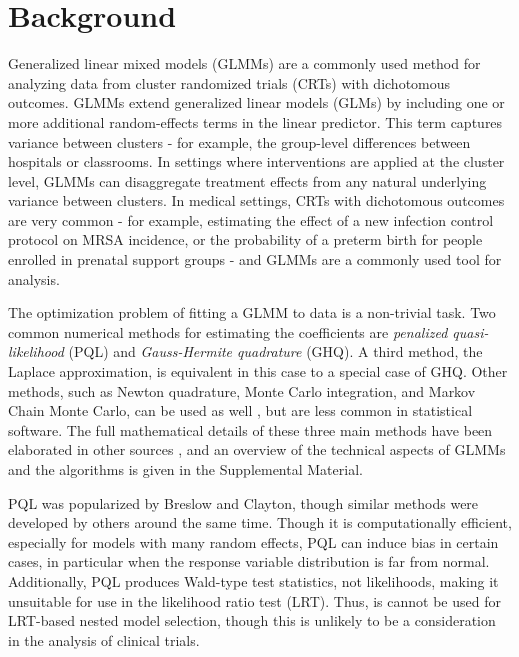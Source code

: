 \documentclass[Afour,times,sagev,doublespace]{sagej}
\begin{document}
\section{Background}
Generalized linear mixed models (GLMMs) are a commonly used method for analyzing data from cluster randomized trials (CRTs) with dichotomous outcomes. GLMMs extend generalized linear models (GLMs) by including one or more additional random-effects terms in the linear predictor. This term captures variance between clusters - for example, the group-level differences between hospitals or classrooms. In settings where interventions are applied at the cluster level, GLMMs can disaggregate treatment effects from any natural underlying variance between clusters. In medical settings, CRTs with dichotomous outcomes are very common - for example, estimating the effect of a new infection control protocol on MRSA incidence, or the probability of a preterm birth for people enrolled in prenatal support groups - and GLMMs are a commonly used tool for analysis. 

The optimization problem of fitting a GLMM to data is a non-trivial task. Two common numerical methods for estimating the coefficients are \textit{penalized quasi-likelihood} (PQL) \cite{wolfinger_generalized_1993} and \textit{Gauss-Hermite quadrature} (GHQ). A third method, the Laplace approximation, is equivalent in this case to a special case of GHQ\cite{liu_note_1994}. Other methods, such as Newton quadrature, Monte Carlo integration, and Markov Chain Monte Carlo, can be used as well \cite{zhang_fitting_2011}, but are less common in statistical software. The full mathematical details of these three main methods have been elaborated in other sources \cite{wolfinger_generalized_1993}\cite{pinheiro_efficient_2006}, and an overview of the technical aspects of GLMMs and the algorithms is given in the Supplemental Material.

PQL was popularized by Breslow and Clayton\cite{breslow_approximate_1993}, though similar methods were developed by others\cite{zeger_models_1988}\cite{engel_simple_1994} around the same time. Though it is computationally efficient, especially for models with many random effects, PQL can induce bias in certain cases, in particular when the response variable distribution is far from normal\cite{agresti_categorical_2013}\cite{rodriguez_assessment_1995}\cite{breslow_bias_1995}\cite{lin_bias_1996}. Additionally, PQL produces Wald-type test statistics, not likelihoods, making it unsuitable for use in the likelihood ratio test (LRT). Thus, is cannot be used for LRT-based nested model selection\cite{zhang_fitting_2011}\cite{pinheiro_efficient_2006}\cite{ng_estimation_2006}, though this is unlikely to be a consideration in the analysis of clinical trials.
\end{document}
